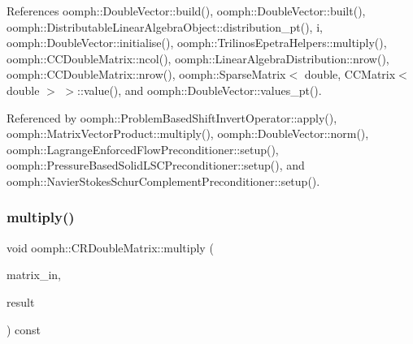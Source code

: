 References oomph\+::\+Double\+Vector\+::build(), oomph\+::\+Double\+Vector\+::built(), oomph\+::\+Distributable\+Linear\+Algebra\+Object\+::distribution\+\_\+pt(), i, oomph\+::\+Double\+Vector\+::initialise(), oomph\+::\+Trilinos\+Epetra\+Helpers\+::multiply(), oomph\+::\+C\+C\+Double\+Matrix\+::ncol(), oomph\+::\+Linear\+Algebra\+Distribution\+::nrow(), oomph\+::\+C\+C\+Double\+Matrix\+::nrow(), oomph\+::\+Sparse\+Matrix$<$ double, C\+C\+Matrix$<$ double $>$ $>$\+::value(), and oomph\+::\+Double\+Vector\+::values\+\_\+pt().



Referenced by oomph\+::\+Problem\+Based\+Shift\+Invert\+Operator\+::apply(), oomph\+::\+Matrix\+Vector\+Product\+::multiply(), oomph\+::\+Double\+Vector\+::norm(), oomph\+::\+Lagrange\+Enforced\+Flow\+Preconditioner\+::setup(), oomph\+::\+Pressure\+Based\+Solid\+L\+S\+C\+Preconditioner\+::setup(), and oomph\+::\+Navier\+Stokes\+Schur\+Complement\+Preconditioner\+::setup().

\mbox{\label{classoomph_1_1CRDoubleMatrix_af08fd73a7edbdbde9facf47b913e3e43}} 
\subsubsection{\texorpdfstring{multiply()}{multiply()}\hspace{0.1cm}{\footnotesize\ttfamily [2/2]}}
{\footnotesize\ttfamily void oomph\+::\+C\+R\+Double\+Matrix\+::multiply (\begin{DoxyParamCaption}\item[{const \hyperlink{classoomph_1_1CRDoubleMatrix}{C\+R\+Double\+Matrix} \&}]{matrix\+\_\+in,  }\item[{\hyperlink{classoomph_1_1CRDoubleMatrix}{C\+R\+Double\+Matrix} \&}]{result }\end{DoxyParamCaption}) const}



